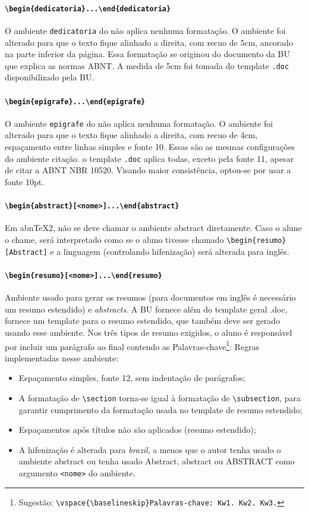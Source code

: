 \documentclass[embeddedlogo]{../ufsc-thesis-rn46-2019}
\newcommand{\lacmd}[1]{\texttt{\textbackslash{}#1}}
\newcommand{\laenv}[1]{\texttt{\textbackslash{}begin\{#1\}...\textbackslash{}end\{#1\}}}
\newcommand{\laenvi}[2]{\texttt{\textbackslash{}begin\{#1\}[#2]...\textbackslash{}end\{#1\}}}
\begin{document}
\paragraph*{\laenv{dedicatoria}}
O ambiente \texttt{dedicatoria} do \abnTeX não aplica nenhuma formatação. O
ambiente foi alterado para que o texto fique alinhado a direita, com recuo de
5cm, ancorado na parte inferior da página. Essa formatação se originou do
documento da BU que explica as normas ABNT. A medida de 5cm foi tomada do
template \texttt{.doc} disponibilizado pela BU.

\paragraph*{\laenv{epigrafe}}
O ambiente \texttt{epigrafe} do \abnTeX não aplica nenhuma formatação. O
ambiente foi alterado para que o texto fique alinhado a direita, com recuo de
4cm, espaçamento entre linhas simples e fonte 10. Essas são as mesmas
configurações do ambiente citação. o template \texttt{.doc} aplica todas, exceto
pela fonte 11, apesar de citar a ABNT NBR 10520. Visando maior consistência,
optou-se por usar a fonte 10pt.

\paragraph*{\laenvi{abstract}{<nome>}}
Em abnTeX2, não se deve chamar o ambiente abstract diretamente. Caso o alune o
chame, será interpretado como se o aluno tivesse chamado
\lacmd{begin\{resumo\}[Abstract]} e a linguagem (controlando hifenização) será
alterada para inglês.

\paragraph*{\laenvi{resumo}{<nome>}}
Ambiente usado para gerar os resumos (para documentos em inglês é necessário um
resumo estendido) e \emph{abstracts}. A BU fornece além do template geral .doc,
fornece um template para o resumo estendido, que também deve ser gerado usando
esse ambiente. Nos três tipos de resumo exigidos, o aluno é responsável por
incluir um parágrafo ao final contendo as Palavras-chave\footnote{Sugestão:
  \lacmd{vspace\{\lacmd{baselineskip}\}Palavras-chave: Kw1. Kw2. Kw3.}}: Regras
implementadas nesse ambiente:
\begin{itemize}
\item Espaçamento simples, fonte 12, sem indentação de parágrafos;
\item A formatação de \lacmd{section} torna-se igual à formatação de
  \lacmd{subsection}, para garantir cumprimento da formatação usada no template de
  resumo estendido;
\item Espaçamentos após títulos não são aplicados (resumo estendido);
\item A hifenização é alterada para \textit{brazil}, a menos que o autor tenha
  usado o ambiente abstract ou tenha usado Abstract, abstract ou ABSTRACT como
  argumento \texttt{<nome>} do ambiente.
\end{itemize}
\end{document}
